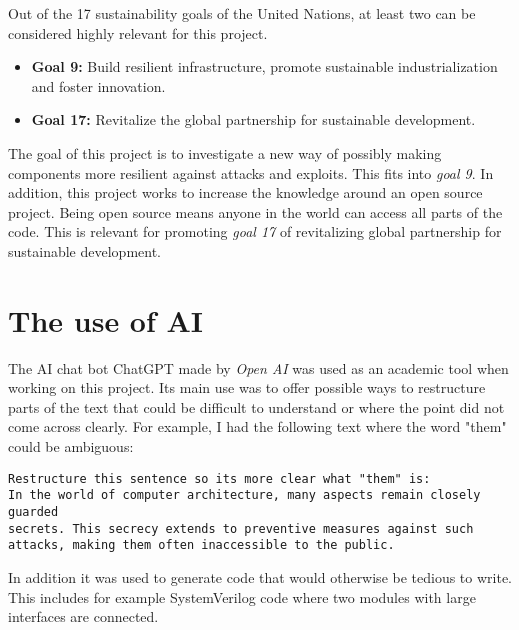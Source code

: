 Out of the 17 sustainability goals of the United Nations\cite{un}, at least two can be considered highly relevant for this project. 

\begin{itemize}
    \item \textbf{Goal 9:} Build resilient infrastructure, promote sustainable industrialization and foster innovation.
    \item \textbf{Goal 17:} Revitalize the global partnership for sustainable development.
\end{itemize}

The goal of this project is to investigate a new way of possibly making components more resilient against attacks and exploits. This fits into \textit{goal 9}. In addition, this project works to increase the knowledge around an open source project. Being open source means anyone in the world can access all parts of the code. This is relevant for promoting \textit{goal 17} of revitalizing global partnership for sustainable development. 

\section{The use of AI}
\label{sec:AI}

The AI chat bot ChatGPT made by \textit{Open AI}\cite{chat} was used as an academic tool when working on this project. Its main use was to offer possible ways to restructure parts of the text that could be difficult to understand or where the point did not come across clearly. For example, I had the following text where the word "them" could be ambiguous: 

\begin{lstlisting}
Restructure this sentence so its more clear what "them" is: 
In the world of computer architecture, many aspects remain closely guarded
secrets. This secrecy extends to preventive measures against such 
attacks, making them often inaccessible to the public.
\end{lstlisting}



In addition it was used to generate code that would otherwise be tedious to write. This includes for example SystemVerilog code where two modules with large interfaces are connected. 